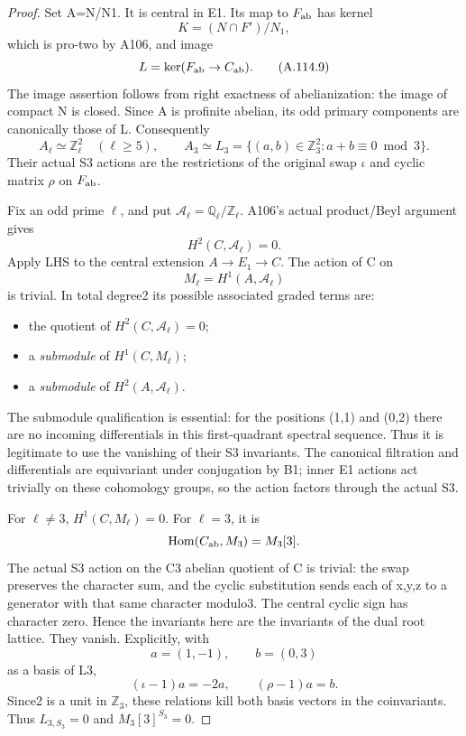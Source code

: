 \begin{proof}
Set A=N/N1. It is central in E1. Its map to \(F_{\rm ab}\) has kernel
\[
K=(N\cap F')/N_1,
\]
which is pro-two by A106, and image
\[
L=\ker(F_{\rm ab}\to C_{\rm ab}).                              \tag{A.114.9}
\]
The image assertion follows from right exactness of abelianization: the image of compact N is closed. Since A is profinite abelian, its odd primary components are canonically those of L. Consequently
\[
A_\ell\simeq\mathbb Z_\ell^2\quad(\ell\ge5),\qquad
A_3\simeq L_3=\{(a,b)\in\mathbb Z_3^2:a+b\equiv0\bmod3\}.     \tag{A.114.10}
\]
Their actual S3 actions are the restrictions of the original swap \(\iota\) and cyclic matrix \(\rho\) on \(F_{\rm ab}\).

Fix an odd prime \(\ell\), and put \(\mathcal A_\ell=\mathbb Q_\ell/\mathbb Z_\ell\). A106's actual product/Beyl argument gives
\[
H^2(C,\mathcal A_\ell)=0.
\]
Apply LHS to the central extension \(A\to E_1\to C\). The action of C on
\[
M_\ell=H^1(A,\mathcal A_\ell)
\]
is trivial. In total degree2 its possible associated graded terms are:
\begin{itemize}
\item the quotient of \(H^2(C,\mathcal A_\ell)=0\);
\item a \emph{submodule} of \(H^1(C,M_\ell)\);
\item a \emph{submodule} of \(H^2(A,\mathcal A_\ell)\).

\end{itemize}
The submodule qualification is essential: for the positions (1,1) and (0,2) there are no incoming differentials in this first-quadrant spectral sequence. Thus it is legitimate to use the vanishing of their S3 invariants. The canonical filtration and differentials are equivariant under conjugation by B1; inner E1 actions act trivially on these cohomology groups, so the action factors through the actual S3.

For \(\ell\ne3\), \(H^1(C,M_\ell)=0\). For \(\ell=3\), it is
\[
\operatorname{Hom}(C_{\rm ab},M_3)=M_3[3].
\]
The actual S3 action on the C3 abelian quotient of C is trivial: the swap preserves the character sum, and the cyclic substitution sends each of x,y,z to a generator with that same character modulo3. The central cyclic sign has character zero. Hence the invariants here are the invariants of the dual root lattice. They vanish. Explicitly, with
\[
a=(1,-1),\qquad b=(0,3)
\]
as a basis of L3,
\[
(\iota-1)a=-2a,\qquad(\rho-1)a=b.
\]
Since2 is a unit in \(\mathbb Z_3\), these relations kill both basis vectors in the coinvariants. Thus \(L_{3,S_3}=0\) and \(M_3[3]^{S_3}=0\).


\end{proof}
